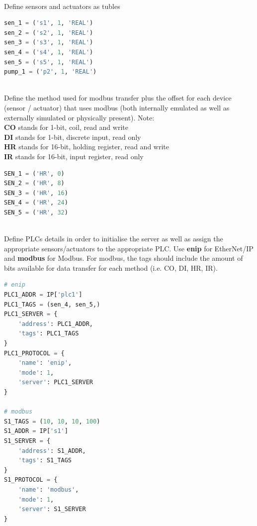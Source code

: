 \documentclass[book,a4paper,12pt,oneside]{memoir}
\begin{document}
\noindent \\ Define sensors and actuators as tubles

\begin{lstlisting}[backgroundcolor = \color{ultralightgray}, language = Python, xleftmargin = 0.1cm, framexleftmargin = 0.3em, showstringspaces=false]
sen_1 = ('s1', 1, 'REAL')
sen_2 = ('s2', 1, 'REAL')
sen_3 = ('s3', 1, 'REAL')
sen_4 = ('s4', 1, 'REAL')
sen_5 = ('s5', 1, 'REAL')
pump_1 = ('p2', 1, 'REAL')
\end{lstlisting}


\noindent \\ Define the method used for modbus transfer plus the offset for each device (sensor / actuator) that uses modbus (both internally emulated as well as externally simulated or physically present).  Note: 
\\\textbf{CO} stands for 1-bit, coil, read and write
\\\textbf{DI}  stands for 1-bit, discrete input, read only
\\\textbf{HR} stands for 16-bit, holding register, read and write
\\\textbf{IR} stands for 16-bit, input register, read only

\begin{lstlisting}[backgroundcolor = \color{ultralightgray}, language = Python, xleftmargin = 0.1cm, framexleftmargin = 0.3em, showstringspaces=false]
SEN_1 = ('HR', 0)
SEN_2 = ('HR', 8)
SEN_3 = ('HR', 16)
SEN_4 = ('HR', 24)
SEN_5 = ('HR', 32)
\end{lstlisting}


\noindent \\ Define PLCs details in order to initialise the server as well as assign the appropriate sensors/actuators to the appropriate PLC.  Use \textbf{enip} for EtherNet/IP and \textbf{modbus} for Modbus.  For modbus, the tags should include the amount of bits available for data transfer for each method (i.e. CO, DI, HR, IR).

\begin{lstlisting}[backgroundcolor = \color{ultralightgray}, language = Python, xleftmargin = 0.1cm, framexleftmargin = 0.3em, showstringspaces=false]
# enip
PLC1_ADDR = IP['plc1']
PLC1_TAGS = (sen_4, sen_5,)
PLC1_SERVER = {
    'address': PLC1_ADDR,
    'tags': PLC1_TAGS
}
PLC1_PROTOCOL = {
    'name': 'enip',
    'mode': 1,
    'server': PLC1_SERVER
}

# modbus
S1_TAGS = (10, 10, 10, 100)
S1_ADDR = IP['s1']
S1_SERVER = {
    'address': S1_ADDR,
    'tags': S1_TAGS
}
S1_PROTOCOL = {
    'name': 'modbus',
    'mode': 1,
    'server': S1_SERVER
}
\end{lstlisting}
\end{document}
